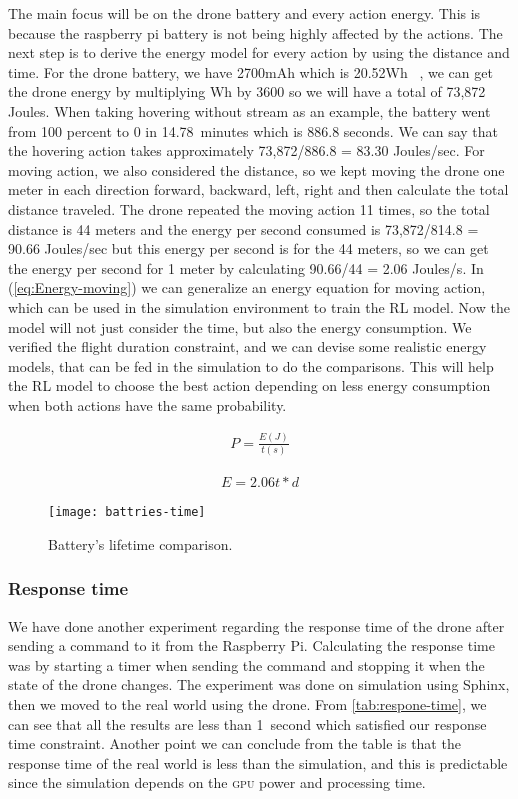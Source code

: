 \documentclass[../main.tex]{subfiles}
\begin{document}
The main focus will be on the drone battery and every 
action energy. This is because the raspberry pi battery 
is not being highly affected by the actions. 
The next step is to derive the energy model for every 
action by using the distance and time. For the drone battery, 
we have 2700mAh which is 20.52Wh ~\cite{Par19}, 
we can get the drone energy by multiplying Wh by 3600 
so we will have a total of 73,872 Joules. When taking
hovering without stream as an example, the battery 
went from 100 percent to 0 in \SI{14.78}{minutes} which is 
886.8 seconds. We can say that the hovering action takes approximately 73,872/886.8 = 83.30 Joules/sec. For moving action,
we also considered the distance, so we kept 
moving the drone one meter in each direction 
{forward, backward, left, right} and then calculate 
the total distance traveled. The drone repeated 
the moving action 11 times, so the total distance 
is 44 meters and the energy per second consumed 
is 73,872/814.8 = 90.66 Joules/sec but this energy 
per second is for the 44 meters, so we can get the 
energy per second for 1 meter by calculating 
90.66/44 = 2.06 Joules/s. 
In (\ref{eq:Energy-moving}) we can generalize an energy equation for moving action, which can be used in the simulation environment to train the RL model. Now the model will not just consider the time, but also the energy consumption.
We verified the flight duration constraint, and we can devise some 
realistic energy models, that can be fed in the simulation to do the comparisons. This will help the RL model to choose 
the best action depending on less energy consumption 
when both actions have the same probability. 

\begin{align}
	P = \frac{E(J)}{t(s)} 
	\label{eq:power}
\end{align}

\begin{align}
	E = 2.06t*d
	\label{eq:Energy-moving}
\end{align}

\begin{figure}[!t]
	\centering
	\texttt{[image: battries-time]}
	\caption{Battery's lifetime comparison.}
	\label{fig:time-comparison}
\end{figure}

\subsubsection{Response time}

We have done another experiment regarding the response time 
of the drone after sending a command to it from the Raspberry Pi. 
Calculating the response time was by starting a timer when 
sending the command and stopping it when the 
state of the drone changes. 
The experiment was done on simulation using Sphinx,
then we moved to the real world using the \anafi drone.
From \cref{tab:respone-time}, 
we can see that all the results are less than \SI{1}{second}
which satisfied our response time constraint.
Another point we can conclude from the table is that 
the response time of the real world is less than 
the simulation, and this is predictable since the simulation
depends on the \textsc{gpu} power and processing time. 
\end{document}
